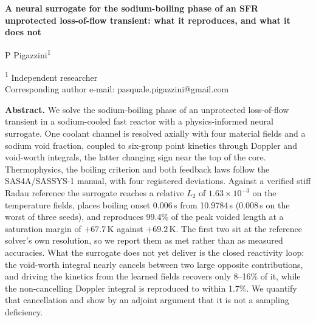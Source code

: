 \documentclass[11pt,a4paper]{article}
\begin{document}
\vspace*{28mm}    %

\begingroup
\raggedright
\fontsize{17}{20}\selectfont\bfseries
A neural surrogate for the sodium-boiling phase of an SFR unprotected loss-of-flow
transient: what it reproduces, and what it does not
\par
\endgroup

\vspace{10mm}

\begingroup
\raggedright \leftskip=25mm
P Pigazzini\textsuperscript{1}
\par
\vspace{0.6em}
\fontsize{10}{12}\selectfont
\textsuperscript{1} Independent researcher\\
Corresponding author e-mail: pasquale.pigazzini@gmail.com
\par
\endgroup

\vspace{1.2em}

\begingroup
\leftskip=25mm
\fontsize{10}{12}\selectfont
\noindent\textbf{Abstract.}
We solve the sodium-boiling phase of an unprotected loss-of-flow transient in a
sodium-cooled fast reactor with a physics-informed neural surrogate. One coolant channel is
resolved axially with four material fields and a sodium void fraction, coupled to six-group
point kinetics through Doppler and void-worth integrals, the latter changing sign near the
top of the core. Thermophysics, the boiling criterion and both feedback laws follow the
SAS4A/SASSYS-1 manual, with four registered deviations. Against a verified stiff Radau
reference the surrogate reaches a relative $L_2$ of $1.63\times10^{-3}$ on the temperature
fields, places boiling onset 0.006\,s from 10.9784\,s (0.008\,s on the worst of three
seeds), and reproduces 99.4\% of the peak voided length at a saturation margin of
$+67.7$\,K against $+69.2$\,K. The first two sit at the reference solver's own resolution,
so we report them as met rather than as measured accuracies. What the surrogate does not
yet deliver is the closed reactivity loop: the void-worth integral nearly cancels between
two large opposite contributions, and driving the kinetics from the learned fields recovers
only 8--16\% of it, while the non-cancelling Doppler integral is reproduced to within
1.7\%. We quantify that cancellation and show by an adjoint argument that it is not a
sampling deficiency.
\par
\endgroup
\end{document}
